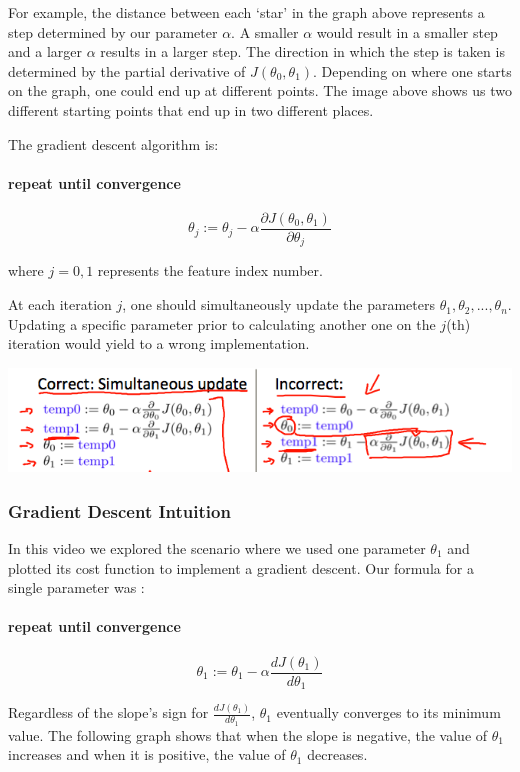 \documentclass[UTF8]{article}
\begin{document}
For example, the distance between each `star' in the graph above represents a step determined by our parameter $\alpha$. A smaller $\alpha$ would result in a smaller step and a larger $\alpha$ results in a larger step. The direction in which the step is taken is determined by the partial derivative of $J(\theta_0,\theta_1)$. Depending on where one starts on the graph, one could end up at different points. The image above shows us two different starting points that end up in two different places.

The gradient descent algorithm is:

\paragraph{repeat until convergence}

\[ \theta_j:=\theta_j - \alpha\frac{\partial J(\theta_0,\theta_1)}{\partial \theta_j} \]

where $j=0,1$ represents the feature index number.

At each iteration $j$, one should simultaneously update the parameters $\theta_1,\theta_2,...,\theta_n$. Updating a specific parameter prior to calculating another one on the $j$(th) iteration would yield to a wrong implementation.

\includegraphics[width = \textwidth]{NotePics/2_3_2.png}

\subsubsection{Gradient Descent Intuition}

In this video we explored the scenario where we used one parameter $\theta_1$ and plotted its cost function to implement a gradient descent. Our formula for a single parameter was :

\paragraph{repeat until convergence}

\[ \theta_1:=\theta_1-\alpha\frac{dJ(\theta_1)}{d\theta_1} \]

Regardless of the slope's sign for $\frac{dJ(\theta_1)}{d\theta_1}$, $\theta_1$ eventually converges to its minimum value. The following graph shows that when the slope is negative, the value of $\theta_1$ increases and when it is positive, the value of $\theta_1$ decreases.
\end{document}
